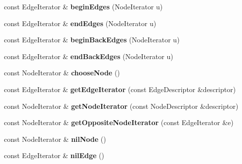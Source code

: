 \begin{DoxyCompactItemize}
\item 
\hypertarget{class_packed_adjacency_vector_impl_af860001af9a731293d9acc04992a214a}{
const EdgeIterator \& {\bfseries beginEdges} (NodeIterator u)}
\label{class_packed_adjacency_vector_impl_af860001af9a731293d9acc04992a214a}

\item 
\hypertarget{class_packed_adjacency_vector_impl_aab1cb48186fa7e4e09fec2b6fe483797}{
const EdgeIterator \& {\bfseries endEdges} (NodeIterator u)}
\label{class_packed_adjacency_vector_impl_aab1cb48186fa7e4e09fec2b6fe483797}

\item 
\hypertarget{class_packed_adjacency_vector_impl_ac8ef218f084cb379b742c536f1bcc115}{
const EdgeIterator \& {\bfseries beginBackEdges} (NodeIterator u)}
\label{class_packed_adjacency_vector_impl_ac8ef218f084cb379b742c536f1bcc115}

\item 
\hypertarget{class_packed_adjacency_vector_impl_aef7cc1c52c539cf506c0a1259f3d387e}{
const EdgeIterator \& {\bfseries endBackEdges} (NodeIterator u)}
\label{class_packed_adjacency_vector_impl_aef7cc1c52c539cf506c0a1259f3d387e}

\item 
\hypertarget{class_packed_adjacency_vector_impl_a56063f4b8cb0ed51b5738d94b36cbb75}{
const NodeIterator \& {\bfseries chooseNode} ()}
\label{class_packed_adjacency_vector_impl_a56063f4b8cb0ed51b5738d94b36cbb75}

\item 
\hypertarget{class_packed_adjacency_vector_impl_a426d0de6a4b87e768f1c8df02b106a48}{
const EdgeIterator \& {\bfseries getEdgeIterator} (const EdgeDescriptor \&descriptor)}
\label{class_packed_adjacency_vector_impl_a426d0de6a4b87e768f1c8df02b106a48}

\item 
\hypertarget{class_packed_adjacency_vector_impl_a70ac4b180d21d6f5005e31bbf6b5fbbd}{
const NodeIterator \& {\bfseries getNodeIterator} (const NodeDescriptor \&descriptor)}
\label{class_packed_adjacency_vector_impl_a70ac4b180d21d6f5005e31bbf6b5fbbd}

\item 
\hypertarget{class_packed_adjacency_vector_impl_a0d9370488c2c68898ae0cf5294a9afb5}{
const NodeIterator \& {\bfseries getOppositeNodeIterator} (const EdgeIterator \&e)}
\label{class_packed_adjacency_vector_impl_a0d9370488c2c68898ae0cf5294a9afb5}

\item 
\hypertarget{class_packed_adjacency_vector_impl_a2b4b4f134e976b19781fdf4d79835e4a}{
const NodeIterator \& {\bfseries nilNode} ()}
\label{class_packed_adjacency_vector_impl_a2b4b4f134e976b19781fdf4d79835e4a}

\item 
\hypertarget{class_packed_adjacency_vector_impl_a0b6091ce461186ca523bb2476a6d599b}{
const EdgeIterator \& {\bfseries nilEdge} ()}
\label{class_packed_adjacency_vector_impl_a0b6091ce461186ca523bb2476a6d599b}

\end{DoxyCompactItemize}
